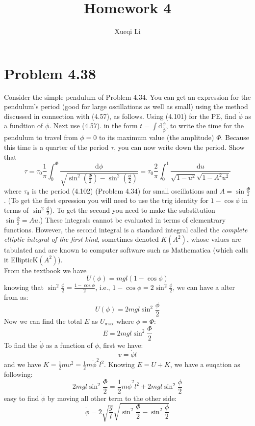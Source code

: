 \documentclass{article}
\newcommand{\de}{\mathrm{d}}
\begin{document}
\title{Homework 4}
\author{Xueqi Li}


\maketitle

\section{Problem 4.38}
Consider the simple pendulum of Problem 4.34. You can get an expression for the pendulum's period (good for large oscillations as well as small) using the method discussed in connection with (4.57), as follows. Using (4.101) for the PE, find $\dot{\phi}$ as a fundtion of $\phi$. Next use (4.57). in the form $t = \int \de \frac{\phi}{\dot{\phi}}$, to write the time for the pendulum to travel from $\phi = 0$ to its maximum value (the amplitude) $\Phi$. Because this time is a quarter of the period $\tau$, you can now write down the period. Show that
\[
\tau = \tau_0 \frac{1}{\pi} \int_0^\Phi \frac{\de \phi}{\sqrt{\sin^2(\frac{\Phi}{2})-\sin^2(\frac{\phi}{2})}} = \tau_0 \frac{2}{\pi}\int_0^1\frac{\de u}{\sqrt{1-u^2}\sqrt{1-A^2u^2}}
\]
where $\tau_0$ is the period (4.102) (Problem 4.34) for small oscillations and $A = \sin\frac{\Phi}{2}$. (To get the first epression you will need to use the trig identity for $1-\cos\phi$ in terms of $\sin^2\frac{\phi}{2}$). To get the second you need to make the substitution $\sin\frac{\phi}{2} = Au$.) These integrals cannot be evaluated in terms of elementrary functions. However, the second integral is a standard integral called the \textit{complete elliptic integral of the first kind}, sometimes denoted $K(A^2)$, whose values are tabulated and are known to computer software such as Mathematica (which calls it EllipticK$(A^2)$).
\\

From the textbook we have 
\[
U(\phi) = mgl (1-\cos\phi)
\]
knowing that $\sin^2\frac{\phi}{2} = \frac{1-\cos\phi}{2}$, i.e., $1-\cos\phi = 2\sin^2\frac{\phi}{2}$, we can have a alter from as:
\[
U(\phi) = 2mgl \sin^2\frac{\phi}{2}
\]
Now we can find the total $E$ as $U_{\text{max}}$ where $\phi = \Phi$:
\[
E = 2mgl \sin^2\frac{\Phi}{2}
\]
To find the $\dot{\phi}$ as a function of $\phi$, first we have:
\[
v = \dot{\phi}l
\]
and we have $K = \frac{1}{2} mv^2 = \frac{1}{2}m\dot{\phi}^2l^2$. Knowing $E = U + K$, we have a euqation as following:
\[
2mgl \sin^2\frac{\Phi}{2} = \frac{1}{2}m\dot{\phi}^2l^2 + 2mgl \sin^2\frac{\phi}{2}
\]
easy to find $\dot\phi$ by moving all other term to the other side:
\[
\dot{\phi} = 2\sqrt{\frac{g}{l}}\sqrt{\sin^2\frac{\Phi}{2} - \sin^2\frac{\phi}{2}}
\]
\end{document}
